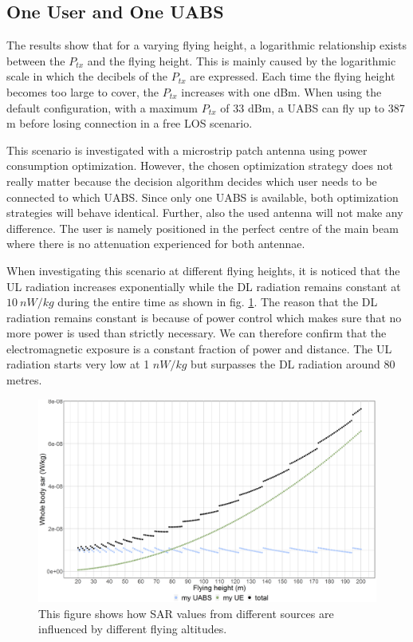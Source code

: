 \documentclass[twocolumn]{phdsymp} %
\begin{document}
\subsection{One User and One \gls{UABS}}
The  results show that for a varying flying height, a logarithmic relationship exists between the $P_{tx}$ and the flying height. 
This is mainly caused by the logarithmic 
scale in which the decibels of the $P_{tx}$ are expressed.
Each time the flying height becomes too large to cover, the 
$P_{tx}$ increases with one dBm. 
When using the default configuration, with a maximum $P_{tx}$ of 33 dBm,
a \gls{UABS} can fly up to 387 m before losing connection in a free \gls{LOS} scenario.

This scenario is investigated with a microstrip patch antenna using power consumption optimization. 
 However, the chosen optimization strategy does not really matter because the decision 
 algorithm decides which user 
needs to be connected to which \gls{UABS}. Since only one \gls{UABS} is available, both optimization strategies will behave identical.
Further, also the used antenna will not make any difference.
The user is namely positioned in the perfect centre of the main beam where there is 
no attenuation experienced for both antennae.

When investigating this scenario at different flying heights, it is noticed
that the \gls{UL} radiation increases exponentially while 
the \gls{DL} radiation remains constant at $10\ nW/kg$ during the entire time as shown in fig. \ref{fig:s1_fhsar}. The reason that the \gls{DL} radiation
remains constant is because of power control which makes sure that no more power is used than strictly necessary. 
We can therefore confirm that the electromagnetic exposure is a constant fraction of power and distance.
The \gls{UL} radiation starts very low at 1 $nW/kg$ but surpasses the \gls{DL} radiation 
around 80 metres.

\begin{figure}[]
\centering
  \includegraphics[width=\linewidth]{fhvssar_extendedAbstract.png}
  \caption{This figure shows how SAR values from different sources are influenced by different flying altitudes.}
  \label{fig:s1_fhsar}
\end{figure}
\end{document}
